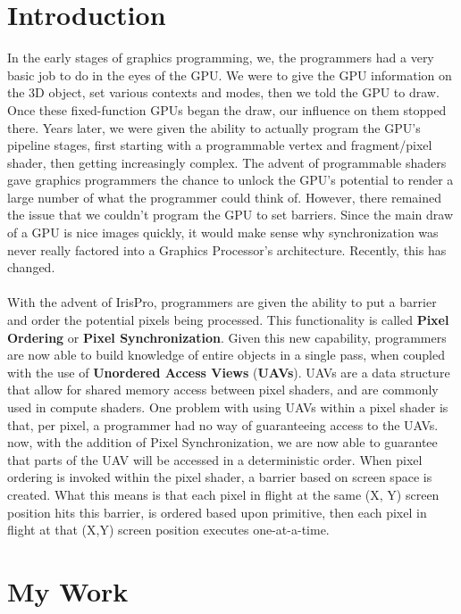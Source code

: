 \documentclass{article}
\begin{document}
\begin{multicols*}{2}  

\section*{\textbf{Introduction}}

In the early stages of graphics programming, we, the programmers had a very
basic job to do in the eyes of the GPU. We were to give the GPU information on
the 3D object, set various contexts and modes, then we told the GPU to draw.
Once these fixed-function GPUs began the draw, our influence on them stopped
there. Years later, we were given the ability to actually program the GPU's
pipeline stages, first starting with a programmable vertex and fragment/pixel
shader, then getting increasingly complex. The advent of programmable shaders
gave graphics programmers the chance to unlock the GPU's potential to render a
large number of what the programmer could think of. However, there remained
the issue that we couldn't program the GPU to set barriers. Since the main
draw of a GPU is nice images quickly, it would make sense why synchronization
was never really factored into a Graphics Processor's architecture. Recently,
this has changed.
\\ \\
With the advent of Iris\texttrademark Pro, programmers are given the ability
to put a barrier and order the potential pixels being processed. This
functionality is called \textbf{Pixel Ordering} or \textbf{Pixel
Synchronization}. Given this new capability, programmers are now able to build
knowledge of entire objects in a single pass, when coupled with the use of
\textbf{Unordered Access Views} (\textbf{UAVs}). UAVs are a data structure
that allow for shared memory access between pixel shaders, and are commonly
used in compute shaders. One problem with using UAVs within a pixel shader is
that, per pixel, a programmer had no way of guaranteeing access to the UAVs.
now, with the addition of Pixel Synchronization, we are now able to guarantee
that parts of the UAV will be accessed in a deterministic order. When pixel
ordering is invoked within the pixel shader, a barrier based on screen space
is created. What this means is that each pixel in flight at the same (X, Y)
screen position hits this barrier, is ordered based upon primitive, then each
pixel in flight at that (X,Y) screen position executes one-at-a-time.

\section*{\textbf{My Work}}


\end{multicols*}
\end{document}
